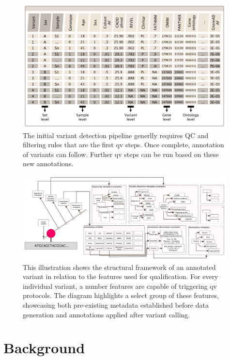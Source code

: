 \begin{figure}[h]
    \centering
   \includegraphics[width=0.99\textwidth]{./images/candidate_variants_sequence_annotation.pdf}
    \caption{The initial variant detection pipeline generlly requires QC and filtering rules that are the first \ac{qv} steps. Once complete, annotation of variants can follow. Further \ac{qv} steps can be run based on these new annotations.}
    \label{fig:candidate_variants_sequence_annotation}
\end{figure}


\begin{figure}[h]
\centering
     \includegraphics[width=0.99\textwidth]{./images/qv_structure_vcurrent.pdf}
\caption{This illustration shows the structural framework of an annotated variant in relation to the features used for qualification. For every individual variant, a number features are capable of triggering \ac{qv} protocols. The diagram highlights a select group of these features, showcasing both pre-existing metadata established before data generation and annotations applied after variant calling.}
\label{fig:qv_structure_vcurrent}
\end{figure}

\clearpage
\section{Background}
